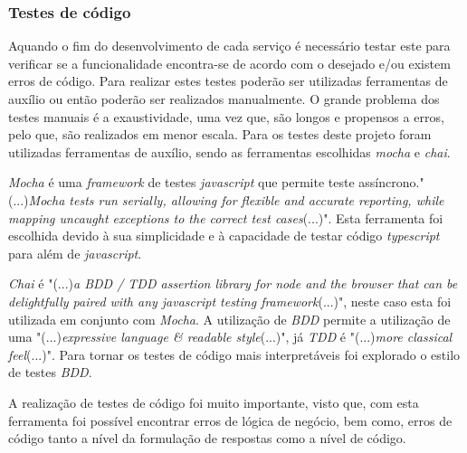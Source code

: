 \subsubsection{Testes de código}
Aquando o fim do desenvolvimento de cada serviço é necessário testar este para verificar se a funcionalidade encontra-se de acordo com o desejado e/ou existem erros de código. Para realizar estes testes poderão ser utilizadas ferramentas de auxílio ou então poderão ser realizados manualmente. O grande problema dos testes manuais é a exaustividade, uma vez que, são longos e propensos a erros, pelo que, são realizados em menor escala. Para os testes deste projeto foram utilizadas ferramentas de auxílio, sendo as ferramentas escolhidas \textit{mocha} e \textit{chai}.

\textit{Mocha} é uma \textit{framework} de testes \textit{javascript} que permite teste assíncrono."(...)\emph{Mocha tests run serially, allowing for flexible and accurate reporting, while mapping uncaught exceptions to the correct test cases}(...)"\citep{mocha}. Esta ferramenta foi escolhida devido à sua simplicidade e à capacidade de testar código \textit{typescript} para além de \textit{javascript}.

\textit{Chai} é "(...)\emph{a BDD / TDD assertion library for node and the browser that can be delightfully paired with any javascript testing framework}(...)"\citep{chai}, neste caso esta foi utilizada em conjunto com \emph{Mocha}. A utilização de \emph{BDD} permite a utilização de uma "(...)\emph{expressive language \& readable style}(...)"\citep{chai}, já \emph{TDD} é "(...)\emph{more classical feel}(...)"\citep{chai}. Para tornar os testes de código mais interpretáveis foi explorado o estilo de testes \emph{BDD}.

A realização de testes de código foi muito importante, visto que, com esta ferramenta foi possível encontrar erros de lógica de negócio, bem como, erros de código tanto a nível da formulação de respostas como a nível de código.



